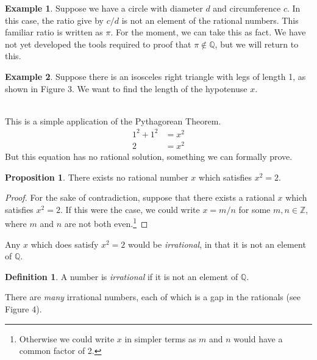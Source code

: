 \documentclass{article}
\newcommand{\Q}{\mathbb{Q}}
\newcommand{\Z}{\mathbb{Z}}
\theoremstyle{definition}
\newtheorem{proposition}{Proposition}[section]
\newtheorem{definition}{Definition}[section]
\newtheorem{example}{Example}[section]
\begin{document}
\begin{example}
	Suppose we have a circle with diameter $ d $ and circumference $ c $. In this case, the ratio give by $ c/d $ is not an element of the rational numbers. This familiar ratio is written as $ \pi $. For the moment, we can take this as fact. We have not yet developed the tools required to proof that $ \pi\notin\Q $, but we will return to this.  
\end{example}
\begin{example}
	Suppose there is an isosceles right triangle with legs of length 1, as shown in Figure 3. We want to find the length of the hypotenuse $ x $. 
	\begin{figure}[h]
		\centering
		\caption{}
	\end{figure}\\
This is a simple application of the Pythagorean Theorem. \begin{align*}
	1^2+1^2&=x^2\\2&=x^2
\end{align*}
But this equation has no rational solution, something we can formally prove. 
\end{example}
\begin{proposition}
	There exists no rational number $ x $ which satisfies $ x^2=2 $. 
\end{proposition}
\begin{proof}
	For the sake of contradiction, suppose that there exists a rational $ x $ which satisfies $ x^2=2 $. If this were the case, we could write $ x=m/n $ for some $ m,n\in\Z $, where $ m $ and $ n $ are not both even.\footnote{Otherwise we could write $ x $ in simpler terms as $ m $ and $ n $ would have a common factor of 2.}
\end{proof}
Any $ x $ which does satisfy $ x^2=2 $ would be \textit{irrational}, in that it is not an element of $ \Q $. 
\begin{definition}
	A number is {\color{red}\textit{irrational}} if it is not an element of $ \Q $. 
\end{definition}
\noindent There are \textit{many} irrational numbers, each of which is a gap in the rationals (see Figure 4). 
\end{document}
